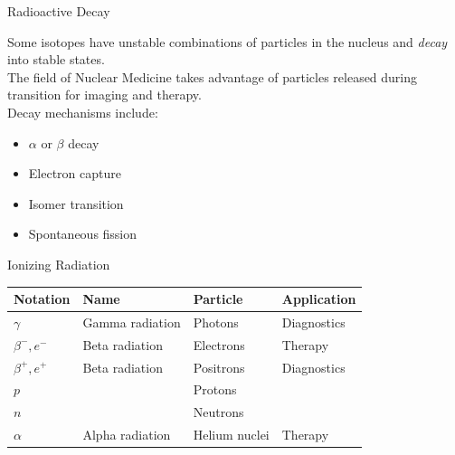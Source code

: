 \begin{frame}[c]{Radioactive Decay}
    \raggedright
    Some isotopes have unstable combinations of particles in the nucleus and \emph{decay} into stable states.\\[0.25cm]
    The field of Nuclear Medicine takes advantage of particles released during transition for imaging and therapy. \\[0.25cm]
    Decay mechanisms include: \\
    \begin{itemize}
        \item $\alpha$ or $\beta$ decay
        \item Electron capture
        \item Isomer transition
        \item Spontaneous fission
    \end{itemize}

\end{frame}


\begin{frame}[c]{Ionizing Radiation}
    \begin{table}[ht]
        \begin{tabular}{|l | l | l| l|}
            \hline
            \textbf{Notation} & \textbf{Name}   & \textbf{Particle} & \textbf{Application} \\
            \hline
            $\gamma$          & Gamma radiation & Photons           & Diagnostics          \\
            \hline
            $\beta^-, e^-$    & Beta radiation  & Electrons         & Therapy              \\
            \hline
            $\beta^+,e^+$     & Beta radiation  & Positrons         & Diagnostics          \\
            \hline
            $p$               &                 & Protons           &                      \\
            \hline
            $n$               &                 & Neutrons          &                      \\
            \hline
            $\alpha$          & Alpha radiation & Helium nuclei     & Therapy              \\
            \hline
        \end{tabular}
    \end{table}

\end{frame}



